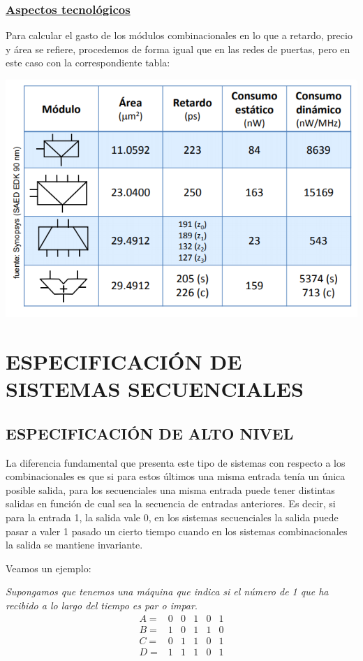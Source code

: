 \documentclass[a4paper,10pt]{book}
\begin{document}
\subsection*{\underline{Aspectos tecnológicos}}
Para calcular el gasto de los módulos combinacionales en lo que a retardo, precio y área se refiere, procedemos de forma igual que en las redes de puertas, pero en este caso con la correspondiente tabla:

\begin{center}
\includegraphics[scale=0.64]{gasto modulos}
\end{center}

\chapter*{ESPECIFICACIÓN DE SISTEMAS SECUENCIALES}
\section*{ESPECIFICACIÓN DE ALTO NIVEL}
La diferencia fundamental que presenta este tipo de sistemas con respecto a los combinacionales es que si para estos últimos una misma entrada tenía un única posible salida, para los secuenciales una misma entrada puede tener distintas salidas en función de cual sea la secuencia de entradas anteriores. Es decir, si para la entrada 1, la salida vale 0, en los sistemas secuenciales la salida puede pasar a valer 1 pasado un cierto tiempo cuando en los sistemas combinacionales la salida se mantiene invariante.

Veamos un ejemplo:\par
\textit{Supongamos que tenemos una máquina que indica si el número de 1 que ha recibido a lo largo del tiempo es par o impar}.
$$\begin{array}{cccccc}
A = & 0 & 0 & 1 & 0 & 1 \\
B = & 1 & 0 & 1 & 1 & 0 \\
C = & 0 & 1 & 1 & 0 & 1 \\
D = & 1 & 1 & 1 & 0 & 1   
\end{array}$$
\end{document}
